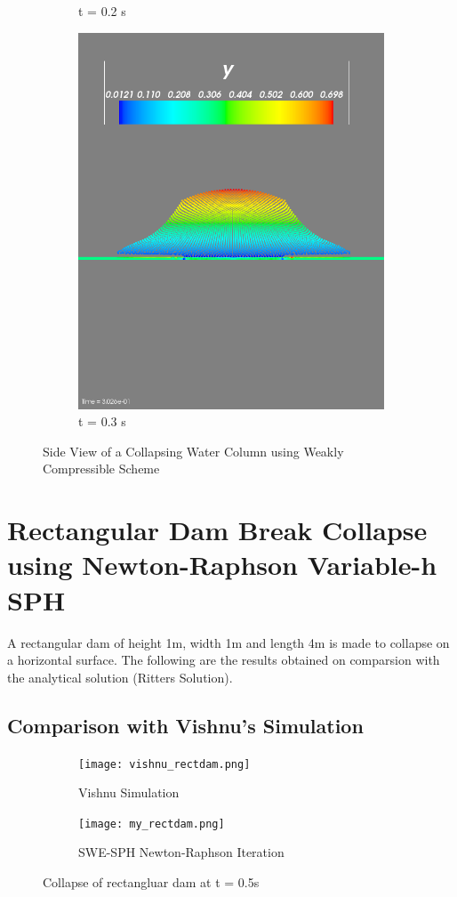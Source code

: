 \documentclass{article}
\begin{document}
\begin{figure}[!htbp]
\begin{subfigure}{.5\textwidth}
  \caption{t = 0.2 s}
  \label{fig:su3}
\end{subfigure}%
\begin{subfigure}{.5\textwidth}
  \centering
  \includegraphics[width=0.8\linewidth]{wc_t3.png}
  \caption{t = 0.3 s}
  \label{fig:su4}
\end{subfigure}
\caption{Side View of a Collapsing Water Column using Weakly Compressible Scheme}
\label{fig:sidecollapsewc}
\end{figure}


\section{Rectangular Dam Break Collapse using Newton-Raphson Variable-h SPH}
A rectangular dam of height 1m, width 1m and length 4m is made to collapse on a 
horizontal surface. The following are the results obtained on comparsion with 
the analytical solution (Ritters Solution).

\subsection{Comparison with Vishnu's Simulation}
\begin{figure}[!htbp]
\centering
\begin{subfigure}{.5\textwidth}
  \centering
  \texttt{[image: vishnu\_rectdam.png]}
  \caption{Vishnu Simulation}
  \label{fig:r11}
\end{subfigure}%
\begin{subfigure}{.5\textwidth}
  \centering
  \texttt{[image: my\_rectdam.png]}
  \caption{SWE-SPH Newton-Raphson Iteration}
  \label{fig:r21}
\end{subfigure}
\caption{Collapse of rectangluar dam at t = 0.5s}
\label{fig:rect}
\end{figure}
\end{document}
